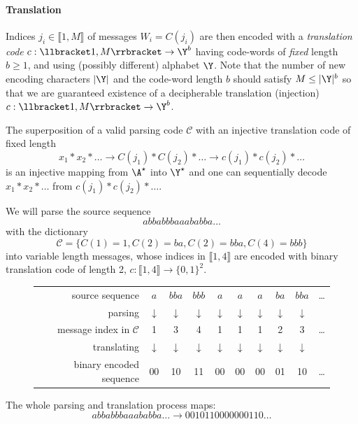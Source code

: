 \documentclass[toc, titlepaged]{../cs-classes/cs-classes}
\begin{document}
\paragraph*{Translation} Indices $j_i\in\llbracket 1, M\rrbracket$ of messages $W_i = C(j_i)$ are then encoded with a \emph{translation code} $c:\llbracket 1, M\rrbracket\to \Y^b$ having code-words of \emph{fixed} length $b\geq1$, and using (possibly different) alphabet $\Y$. Note that the number of new encoding characters $|\Y|$ and the code-word length $b$ should satisfy $M\leq|\Y|^b$ so that we are guaranteed existence of a decipherable translation (injection) $c:\llbracket 1, M\rrbracket\to\Y^b$.

The superposition of a valid parsing code $\mathcal{C}$ with an injective translation code of fixed length
\begin{equation*}
    x_1*x_2*\dots \longrightarrow C(j_1)*C(j_2)*\dots \longrightarrow c(j_1)*c(j_2)*\dots
\end{equation*}
is an injective mapping from $\A^\star$ into $\Y^\star$ and one can sequentially decode $x_1*x_2*\dots$ from $c(j_1)*c(j_2)*\dots$.

\begin{example}
    We will parse the source sequence
    \begin{equation*}
        abbabbbaaababba\dots
    \end{equation*}
    with the dictionary
    \begin{equation*}
        \mathcal{C} = \{C(1) = 1, C(2)=ba, C(2)=bba, C(4)=bbb\}
    \end{equation*}
    into variable length messages, whose indices in $\llbracket 1, 4\rrbracket$ are encoded with binary translation code of length 2, $c:\llbracket 1, 4\rrbracket \to \{0, 1\}^2$.

    \begin{figure}[!ht]
        \centering
        \renewcommand{\arraystretch}{1.3}
        \begin{tabular}{r c c c c c c c c c}
            source sequence&$a$&$bba$&$bbb$&$a$&$a$&$a$&$ba$&$bba$&\dots\\
            parsing&$\downarrow$&$\downarrow$&$\downarrow$&$\downarrow$&$\downarrow$&$\downarrow$&$\downarrow$&$\downarrow$\\
            message index in $\mathcal{C}$&1&3&4&1&1&1&2&3&\dots\\
            translating&$\downarrow$&$\downarrow$&$\downarrow$&$\downarrow$&$\downarrow$&$\downarrow$&$\downarrow$&$\downarrow$\\
            binary encoded sequence&00&10&11&00&00&00&01&10&\dots
        \end{tabular}
    \end{figure}

    The whole parsing and translation process maps:
    \begin{equation*}
        abbabbbaaababba\dots \longrightarrow 0010110000000110\dots
    \end{equation*}
\end{example}
\end{document}
